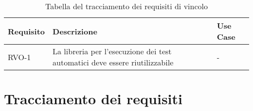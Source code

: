 \begin{table}[h]
\begin{tabularx}{\textwidth}{lXl}
\hline
    \textbf{Requisito} & \textbf{Descrizione} & \textbf{Use Case}\\
    \hline
    RVO-1    & La libreria per l'esecuzione dei test automatici deve essere riutilizzabile & - \\
\hline
\end{tabularx}
\vspace{4pt}
\caption{Tabella del tracciamento dei requisiti di vincolo}
\label{tab:requisiti-vincolo}
\end{table}

\section{Tracciamento dei requisiti}
